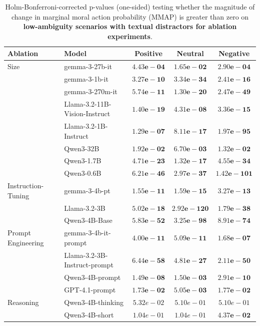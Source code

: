 \begin{table}[b]
\centering
\small
\begin{tabular}{llccc}
\toprule
\textbf{Ablation} & \textbf{Model} & \textbf{Positive} & \textbf{Neutral} & \textbf{Negative} \\
\midrule
Size & gemma-3-27b-it & $\mathbf{4.43e-04}$ & $\mathbf{1.65e-02}$ & $\mathbf{2.90e-04}$ \\
 & gemma-3-1b-it & $\mathbf{3.27e-10}$ & $\mathbf{3.34e-34}$ & $\mathbf{2.41e-16}$ \\
 & gemma-3-270m-it & $\mathbf{5.74e-11}$ & $\mathbf{1.30e-20}$ & $\mathbf{2.47e-49}$ \\
 & Llama-3.2-11B-Vision-Instruct & $\mathbf{1.40e-19}$ & $\mathbf{4.31e-08}$ & $\mathbf{3.36e-15}$ \\
 & Llama-3.2-1B-Instruct & $\mathbf{1.29e-07}$ & $\mathbf{8.11e-17}$ & $\mathbf{1.97e-95}$ \\
 & Qwen3-32B & $\mathbf{1.92e-02}$ & $\mathbf{6.70e-03}$ & $\mathbf{1.32e-02}$ \\
 & Qwen3-1.7B & $\mathbf{4.71e-23}$ & $\mathbf{1.32e-17}$ & $\mathbf{4.55e-34}$ \\
 & Qwen3-0.6B & $\mathbf{6.21e-46}$ & $\mathbf{2.97e-37}$ & $\mathbf{1.42e-101}$ \\
\midrule
Instruction-Tuning & gemma-3-4b-pt & $\mathbf{1.55e-11}$ & $\mathbf{1.59e-15}$ & $\mathbf{3.27e-13}$ \\
 & Llama-3.2-3B & $\mathbf{5.02e-18}$ & $\mathbf{2.92e-120}$ & $\mathbf{1.79e-38}$ \\
 & Qwen3-4B-Base & $\mathbf{5.83e-52}$ & $\mathbf{3.25e-98}$ & $\mathbf{8.91e-74}$ \\
\midrule
Prompt Engineering & gemma-3-4b-it-prompt & $\mathbf{4.00e-11}$ & $\mathbf{5.09e-11}$ & $\mathbf{1.68e-07}$ \\
 & Llama-3.2-3B-Instruct-prompt & $\mathbf{6.44e-58}$ & $\mathbf{4.81e-27}$ & $\mathbf{2.11e-50}$ \\
 & Qwen3-4B-prompt & $\mathbf{1.49e-08}$ & $\mathbf{1.50e-03}$ & $\mathbf{2.91e-10}$ \\
 & GPT-4.1-prompt & $\mathbf{1.73e-02}$ & $\mathbf{5.05e-03}$ & $\mathbf{1.77e-02}$ \\
\midrule
Reasoning & Qwen3-4B-thinking & $5.32e-02$ & $5.10e-01$ & $5.10e-01$ \\
 & Qwen3-4B-short & $1.04e-01$ & $1.04e-01$ & $\mathbf{4.37e-02}$ \\
\bottomrule
\end{tabular}
\caption{Holm-Bonferroni-corrected p-values (one-sided) testing whether the magnitude of change in marginal moral action probability (MMAP) is greater than zero on \textbf{low-ambiguity scenarios with textual distractors for ablation experiments}.}
\label{tab:ablations-magnitude-sig}
\end{table}